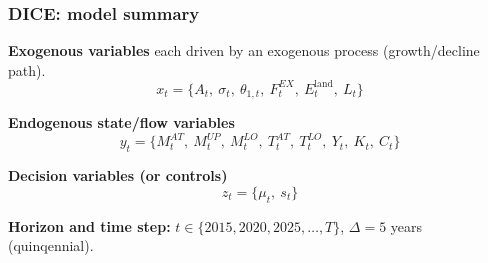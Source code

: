 \documentclass[xcolor=x11names,compress,aspectratio=169]{beamer}%
\makeatletter
\renewenvironment{itemize}{\begin{compactitemize}[<+-| alert@+>]}{\end{compactitemize}}
\makeatother
\begin{document}
\begin{frame}%
%

\frametitle{DICE: model summary}%


\begin{itemize}
\item \textbf{Exogenous variables} each driven by an exogenous process
(growth/decline path).%
\[
x_{t}=\{A_{t},\ \sigma_{t},\ \theta_{1,t},\ F_{t}^{EX},\ E_{t}^{\text{land}%
},\ L_{t}\}
\]


\item \textbf{Endogenous state/flow variables}%
\[
y_{t}=\{M_{t}^{AT},\ M_{t}^{UP},\ M_{t}^{LO},\ T_{t}^{AT},\ T_{t}^{LO}%
,\ Y_{t},\ K_{t},\ C_{t}\}
\]


\item \textbf{Decision variables (or controls)}%
\[
z_{t}=\{\mu_{t},\ s_{t}\}
\]


\item \textbf{Horizon and time step:} $t\in\{2015,2020,2025,\ldots,T\}$,
$\Delta=5$ years (quinqennial).
\end{itemize}

%

\transboxout
\end{frame}%
%
\end{document}
